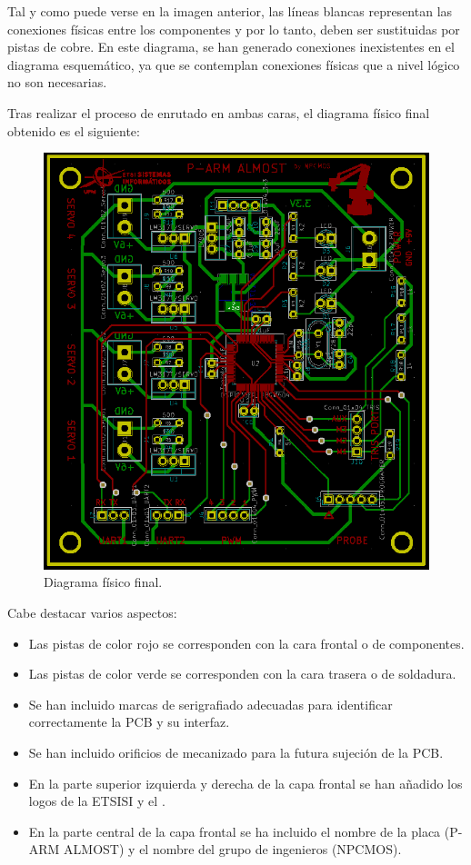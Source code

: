 Tal y como puede verse en la imagen anterior, las líneas blancas representan las conexiones físicas entre los componentes y por lo tanto, deben ser sustituidas por pistas de cobre. En este diagrama, se han generado conexiones inexistentes en el diagrama esquemático, ya que se contemplan conexiones físicas que a nivel lógico no son necesarias.

Tras realizar el proceso de enrutado en ambas caras, el diagrama físico final obtenido es el siguiente:

\begin{figure}[H]
\centering
\includegraphics[width=0.9\linewidth]{pictures/PCB_FINAL_FIXED.PNG}
\caption{Diagrama físico final.}
\label{fig:CAMBIAR!!!!!!!!!!}
\end{figure}

Cabe destacar varios aspectos:
\begin{itemize}
    \item Las pistas de color rojo se corresponden con la cara frontal o de componentes.
    \item Las pistas de color verde se corresponden con la cara trasera o de soldadura.
    \item Se han incluido marcas de serigrafiado adecuadas para identificar correctamente la \ac{PCB} y su interfaz.
    \item Se han incluido orificios de mecanizado para la futura sujeción de la \ac{PCB}.
    \item En la parte superior izquierda y derecha de la capa frontal se han añadido los logos de la ETSISI y el \pArm{}.
    \item En la parte central de la capa frontal se ha incluido el nombre de la placa (P-ARM ALMOST) y el nombre del grupo de ingenieros (NPCMOS).
\end{itemize}

